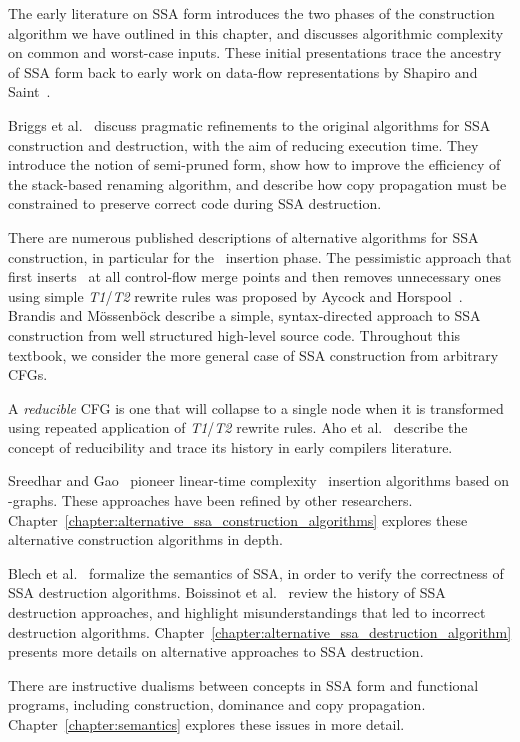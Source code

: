 {The early literature on SSA form
\cite{cytron89efficient,cytron91efficiently}
introduces the two phases of the construction algorithm
we have outlined in this chapter,
and discusses algorithmic complexity on common and worst-case inputs.
These initial presentations trace the ancestry of SSA form back to
early work on data-flow representations by Shapiro and Saint~\cite{shapiro69representation}.

Briggs et al.~\cite{briggs98practical} discuss pragmatic
refinements to the original algorithms for SSA construction
and destruction, with the aim of reducing execution time.
They introduce the notion of semi-pruned form, %
show how to improve the efficiency of the stack-based renaming
algorithm,
and describe how copy propagation must be constrained to
preserve correct code during SSA destruction.

There are numerous published descriptions of alternative algorithms
for SSA construction, in particular for the \phifun\ insertion phase.
The pessimistic approach that first inserts \phifuns\ at all control-flow merge points and then removes unnecessary ones using simple
\emph{T1}/\emph{T2}
rewrite rules was proposed by Aycock
and Horspool~\cite{aycock00simple}. 
Brandis and M\"{o}ssenb\"{o}ck 
\cite{brandis94single}
describe a 
simple, syntax-directed approach to SSA construction from 
well structured high-level source code.
Throughout this textbook, we consider the more
general case of SSA construction from arbitrary CFGs.

A \textit{reducible} CFG is one that will collapse to a single node when 
it is transformed using repeated application of \emph{T1}/\emph{T2}
rewrite rules.
Aho et al.~\cite{aho86compilers} describe the concept of reducibility
and trace its history in early compilers literature.

Sreedhar and Gao~\cite{Sreedhar:1995:PoPL} pioneer
linear-time complexity 
\phifun\ insertion
algorithms based on \DJ-graphs.
These approaches have been refined by other researchers.
Chapter~\ref{chapter:alternative_ssa_construction_algorithms}
explores these alternative construction algorithms in depth.


Blech et al.~\cite{blech05optimizing}
formalize the semantics of SSA, in order to verify
the correctness of SSA destruction algorithms.
Boissinot et al.~\cite{boissinot09revisiting} review the history of SSA destruction approaches,
and highlight misunderstandings that led to incorrect destruction
algorithms.
Chapter~\ref{chapter:alternative_ssa_destruction_algorithm} presents
more details on alternative approaches to SSA destruction.

There are instructive dualisms between concepts in SSA form
and
functional programs, including construction, dominance and
copy propagation. Chapter~\ref{chapter:semantics} explores these issues
in more detail.


}

